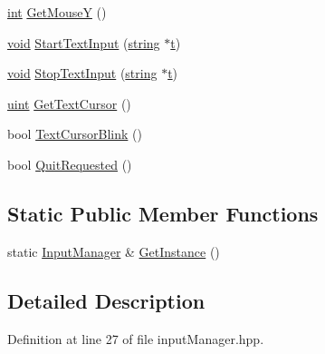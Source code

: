 \begin{DoxyCompactItemize}
\item 
\hyperlink{_s_d_l__thread_8h_a6a64f9be4433e4de6e2f2f548cf3c08e}{int} \hyperlink{class_input_manager_a3fe1eecc6fd43ae5d0366c8492febbf8}{Get\-Mouse\-Y} ()
\item 
\hyperlink{_s_d_l__opengles2__gl2ext_8h_ae5d8fa23ad07c48bb609509eae494c95}{void} \hyperlink{class_input_manager_ab7c93dc59eac5cf2aa39a0725b7e185a}{Start\-Text\-Input} (\hyperlink{_s_d_l__opengl__glext_8h_ae84541b4f3d8e1ea24ec0f466a8c568b}{string} $\ast$\hyperlink{_s_d_l__opengl_8h_a7d65d00ca3b0630d9b5c52df855b19f5}{t})
\item 
\hyperlink{_s_d_l__opengles2__gl2ext_8h_ae5d8fa23ad07c48bb609509eae494c95}{void} \hyperlink{class_input_manager_a203be7f65a84b6906f74bb415cebf1f4}{Stop\-Text\-Input} (\hyperlink{_s_d_l__opengl__glext_8h_ae84541b4f3d8e1ea24ec0f466a8c568b}{string} $\ast$\hyperlink{_s_d_l__opengl_8h_a7d65d00ca3b0630d9b5c52df855b19f5}{t})
\item 
\hyperlink{common_8hpp_a69aa29b598b851b0640aa225a9e5d61d}{uint} \hyperlink{class_input_manager_ad46238780b7097eff858032ee210bdfc}{Get\-Text\-Cursor} ()
\item 
bool \hyperlink{class_input_manager_a5e9fc5df31985953b55de2d8d7fd3221}{Text\-Cursor\-Blink} ()
\item 
bool \hyperlink{class_input_manager_a74d0310e549ea5adf96e7f57f5886de3}{Quit\-Requested} ()
\end{DoxyCompactItemize}
\subsection*{Static Public Member Functions}
\begin{DoxyCompactItemize}
\item 
static \hyperlink{class_input_manager}{Input\-Manager} \& \hyperlink{class_input_manager_a33357912089ca3ffeed9733a2b0a6748}{Get\-Instance} ()
\end{DoxyCompactItemize}


\subsection{Detailed Description}


Definition at line 27 of file input\-Manager.\-hpp.



